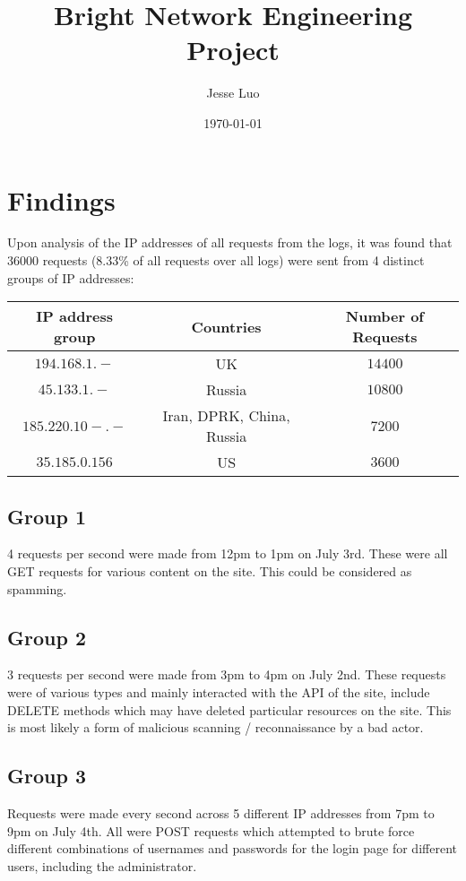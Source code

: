 \documentclass[11pt]{article}
\title{Bright Network Engineering Project}
\author{Jesse Luo}
\date{\today}
\begin{document}
\maketitle	
\pagebreak

\section{Findings}

Upon analysis of the IP addresses of all requests from the logs, it was found that 36000 requests (8.33\% of all requests over all logs) were sent from 4 distinct groups of IP addresses:
\begin{center}
\begin{tabular}{c|c|c}
IP address group & Countries & Number of Requests\\
\hline
$194.168.1.-$ & UK & $14400$ \\
$45.133.1.-$ & Russia & $10800$ \\
$185.220.10-.-$ & Iran, DPRK, China, Russia& $7200$  \\
$35.185.0.156$ & US & $3600$ \\
\end{tabular}
\end{center}

\subsection{Group 1}

4 requests per second were made from 12pm to 1pm on July 3rd. These were all GET requests for various content on the site. This could be considered as spamming.

\subsection{Group 2}

3 requests per second were made from 3pm to 4pm on July 2nd. These requests were of various types and mainly interacted with the API of the site, include DELETE methods which may have deleted particular resources on the site. This is most likely a form of malicious scanning / reconnaissance by a bad actor.

\subsection{Group 3}

Requests were made every second across 5 different IP addresses from 7pm to 9pm on July 4th. All were POST requests which attempted to brute force different combinations of usernames and passwords for the login page for different users, including the administrator.
\end{document}
